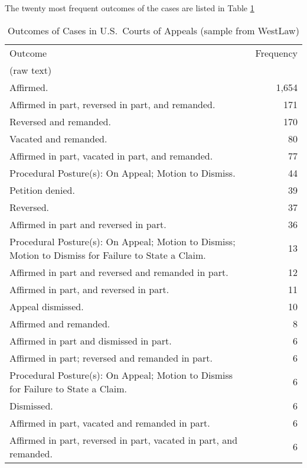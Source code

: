 \documentclass[11pt]{paper}
\begin{document}
The twenty most frequent outcomes of the cases are listed in 
Table \ref{tab:outcome_list}
% 
\begin{table}[ht]
\centering
\begin{tabular}{p{5in} r}
  \hline
	Outcome 		& Frequency \\ 
	(raw text) 	&  \\ 
  \hline
Affirmed.                                                                                        & 1,654 \\
Affirmed in part, reversed in part, and remanded.                             & 171 \\
Reversed and remanded.                                                                 & 170 \\
Vacated and remanded.                                                                   &  80 \\
Affirmed in part, vacated in part, and remanded.                               &  77 \\
Procedural Posture(s): On Appeal; Motion to Dismiss.                        &  44 \\
Petition denied.                                                                                &  39 \\
Reversed.                                                                                         &  37 \\
Affirmed in part and reversed in part.                                                &  36 \\
Procedural Posture(s): On Appeal; Motion to Dismiss; 
Motion to Dismiss for Failure to State a Claim.     						&  13 \\
Affirmed in part and reversed and remanded in part.                          &  12 \\
Affirmed in part, and reversed in part.                                                &  11 \\
Appeal dismissed.                                                                              &  10 \\
Affirmed and remanded.                                                                    &    8 \\
Affirmed in part and dismissed in part.                                               &    6 \\
Affirmed in part; reversed and remanded in part.                               &    6 \\
Procedural Posture(s): On Appeal; 
Motion to Dismiss for Failure to State a Claim.                         			&    6 \\
Dismissed.                                                                                         &   6 \\
Affirmed in part, vacated and remanded in part.                                  &    6 \\
Affirmed in part, reversed in part, vacated in part, and remanded.       &    6 \\
   \hline
\end{tabular}
\caption{Outcomes of Cases in U.S.~Courts of Appeals (sample from WestLaw)} 
\label{tab:outcome_list}
\end{table}
\end{document}
